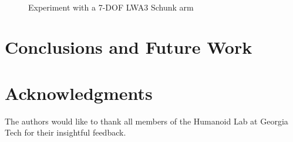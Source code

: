 \documentclass[conference]{IEEEtran}
\begin{document}

\begin{figure}[]
  \centering
   \\
  \caption{ Experiment with a 7-DOF LWA3 Schunk arm}
  \label{fig:Experiment2_Barret}
\end{figure}


\section{Conclusions and Future Work}
\label{sec:Conclusions}


\section*{Acknowledgments}
The authors would like to thank all members of the Humanoid Lab
at Georgia Tech for their insightful feedback.



\end{document}
